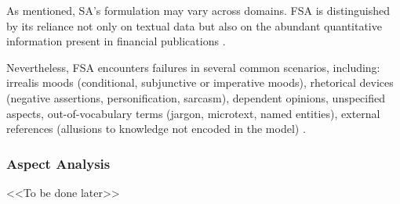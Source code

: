 As mentioned, SA's formulation may vary across domains. FSA is distinguished by its reliance not only
on textual data but also on the abundant quantitative information present in financial publications
\parencite{FSA2024techniques}.

Nevertheless, FSA encounters failures in several common scenarios, including: irrealis moods (conditional,
subjunctive or imperative moods), rhetorical devices (negative assertions, personification, sarcasm),
dependent opinions, unspecified aspects, out-of-vocabulary terms (jargon, microtext, named entities),
external references (allusions to knowledge not encoded in the model) \parencite{FSA2020problems}.

\subsubsection{Aspect Analysis}
\label{sec:absa}
<<To be done later>>